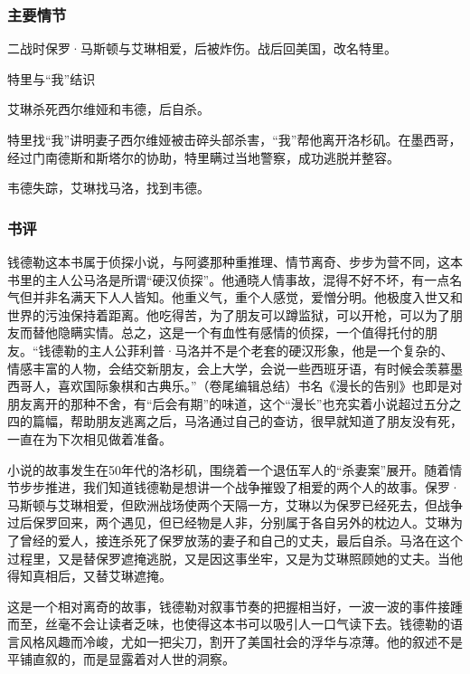 \subsubsection{主要情节}

\begin{itemize*}
    \item 二战时保罗·马斯顿与艾琳相爱，后被炸伤。战后回美国，改名特里。
    \item 特里与“我”结识
    \item 艾琳杀死西尔维娅和韦德，后自杀。
    \item 特里找“我”讲明妻子西尔维娅被击碎头部杀害，“我”帮他离开洛杉矶。在墨西哥，经过门南德斯和斯塔尔的协助，特里瞒过当地警察，成功逃脱并整容。
    \item 韦德失踪，艾琳找马洛，找到韦德。
\end{itemize*}

\subsubsection{书评}

钱德勒这本书属于侦探小说，与阿婆那种重推理、情节离奇、步步为营不同，这本书里的主人公马洛是所谓“硬汉侦探”。他通晓人情事故，混得不好不坏，有一点名气但并非名满天下人人皆知。他重义气，重个人感觉，爱憎分明。他极度入世又和世界的污浊保持着距离。他吃得苦，为了朋友可以蹲监狱，可以开枪，可以为了朋友而替他隐瞒实情。总之，这是一个有血性有感情的侦探，一个值得托付的朋友。“钱德勒的主人公菲利普·马洛并不是个老套的硬汉形象，他是一个复杂的、情感丰富的人物，会结交新朋友，会上大学，会说一些西班牙语，有时候会羡慕墨西哥人，喜欢国际象棋和古典乐。”（卷尾编辑总结）书名《漫长的告别》也即是对朋友离开的那种不舍，有“后会有期”的味道，这个“漫长”也充实着小说超过五分之四的篇幅，帮助朋友逃离之后，马洛通过自己的查访，很早就知道了朋友没有死，一直在为下次相见做着准备。

小说的故事发生在50年代的洛杉矶，围绕着一个退伍军人的“杀妻案”展开。随着情节步步推进，我们知道钱德勒是想讲一个战争摧毁了相爱的两个人的故事。保罗·马斯顿与艾琳相爱，但欧洲战场使两个天隔一方，艾琳以为保罗已经死去，但战争过后保罗回来，两个遇见，但已经物是人非，分别属于各自另外的枕边人。艾琳为了曾经的爱人，接连杀死了保罗放荡的妻子和自己的丈夫，最后自杀。马洛在这个过程里，又是替保罗遮掩逃脱，又是因这事坐牢，又是为艾琳照顾她的丈夫。当他得知真相后，又替艾琳遮掩。

这是一个相对离奇的故事，钱德勒对叙事节奏的把握相当好，一波一波的事件接踵而至，丝毫不会让读者乏味，也使得这本书可以吸引人一口气读下去。钱德勒的语言风格风趣而冷峻，尤如一把尖刀，割开了美国社会的浮华与凉薄。他的叙述不是平铺直叙的，而是显露着对人世的洞察。

